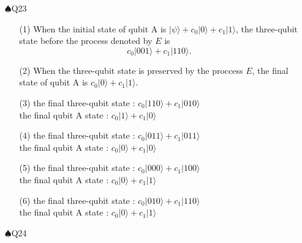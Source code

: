 \documentclass{jarticle}
\newcommand{\qubit}[1]{\vert{#1}\rangle}
\begin{document}
\begin{itemize}
\begin{enumerate}
        \end{enumerate}
    \item[$\spadesuit$Q23] 
        \begin{enumerate}

        \item[(1)] When the initial state of qubit A is $\qubit{\psi}+c_0\qubit{0}+c_1\qubit{1}$, 
            the three-qubit state before the process denoted by $E$ is 
            \begin{equation}
                c_0\qubit{001}+c_1\qubit{110}.
            \end{equation}

        \item[(2)] When the three-qubit state is preserved by the proccess $E$, 
            the final state of qubit A is $c_0\qubit{0}+c_1\qubit{1}$.

        \item[(3)] the final three-qubit state : $c_0\qubit{110}+c_1\qubit{010}$\\
                the final qubit A state : $c_0\qubit{1}+c_1\qubit{0}$

        \item[(4)] the final three-qubit state : $c_0\qubit{011}+c_1\qubit{011}$\\
                the final qubit A state : $c_0\qubit{0}+c_1\qubit{0}$
            
        \item[(5)] the final three-qubit state : $c_0\qubit{000}+c_1\qubit{100}$\\
                the final qubit A state : $c_0\qubit{0}+c_1\qubit{1}$

        \item[(6)] the final three-qubit state : $c_0\qubit{010}+c_1\qubit{110}$\\
                the final qubit A state : $c_0\qubit{0}+c_1\qubit{1}$

        \end{enumerate}
    \item[$\spadesuit$Q24]  
    
\end{itemize}
\end{document}
